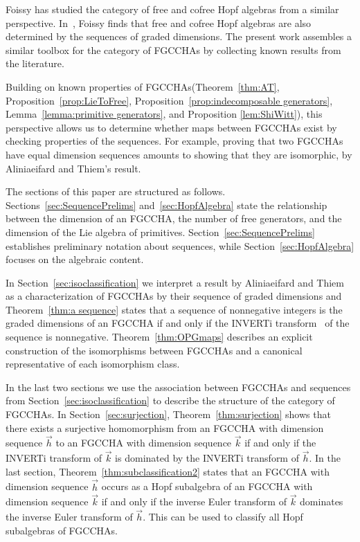 \documentclass[11pt]{amsart}
\theoremstyle{definition}
\numberwithin{equation}{section}
\newcommand{\FGCCHA}{\textsf{FGCCHA}\xspace}
\newcommand{\FGCCHAs}{\textsf{FGCCHA}s\xspace}
\begin{document}
Foissy \cite{F12} has studied the category of free and cofree Hopf algebras from a similar perspective. 
In~\cite[Proposition 23]{F12}, Foissy finds that free and cofree Hopf algebras are also determined by the sequences of
graded dimensions.  
The present work assembles a similar toolbox for the category of \FGCCHAs by collecting known results from the literature.

Building on known properties of \FGCCHAs (Theorem~\ref{thm:AT}, Proposition~\ref{prop:LieToFree}, Proposition~\ref{prop:indecomposable generators}, Lemma~\ref{lemma:primitive generators}, and Proposition \ref{lem:ShiWitt}), this perspective allows us to determine whether maps between \FGCCHAs exist by checking properties of the sequences.  
For example, proving that two \FGCCHAs have equal dimension sequences amounts to showing that they are isomorphic, by Aliniaeifard and Thiem's result.

The sections of this paper are structured as follows.
Sections~\ref{sec:SequencePrelims} and~\ref{sec:HopfAlgebra} state the
relationship between the dimension of an \FGCCHA, the number of free generators,
and the dimension of the Lie algebra of primitives. Section~\ref{sec:SequencePrelims}
establishes preliminary notation about sequences, while Section~\ref{sec:HopfAlgebra}
focuses on the algebraic content.

In Section~\ref{sec:isoclassification} we interpret a result by
Aliniaeifard and Thiem as a characterization of \FGCCHAs by their
sequence of graded dimensions and Theorem~\ref{thm:a sequence}
states that a sequence of nonnegative integers is the graded
dimensions of an \FGCCHA if and only if the INVERTi transform~\cite{OEIS}
of the sequence is nonnegative.
Theorem~\ref{thm:OPGmaps} describes an explicit construction of the
isomorphisms between \FGCCHAs and a canonical representative of each isomorphism class.

In the last two sections we use the association between \FGCCHAs
and sequences from Section~\ref{sec:isoclassification}
to describe the structure of the category of \FGCCHAs.
In Section~\ref{sec:surjection}, Theorem~\ref{thm:surjection} 
shows that there exists a surjective homomorphism from an \FGCCHA with
dimension sequence $\vec{h}$ to an \FGCCHA with dimension sequence 
$\vec{k}$ if and only if the INVERTi transform of $\vec{k}$ is dominated by 
the INVERTi transform of $\vec{h}$.
In the last section, Theorem~\ref{thm:subclassification2} states
that an \FGCCHA  with dimension sequence $\vec{h}$ occurs as a Hopf 
subalgebra of an \FGCCHA with dimension sequence $\vec{k}$ if and only if 
the inverse Euler transform of $\vec{k}$ dominates the inverse Euler transform of $\vec{h}$.  
This can be used to classify all Hopf subalgebras of \FGCCHAs.
\end{document}
